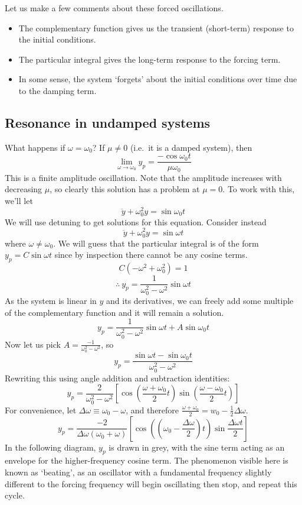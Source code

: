 Let us make a few comments about these forced oscillations.
\begin{itemize}
	\item The complementary function gives us the transient (short-term) response to the initial conditions.
	\item The particular integral gives the long-term response to the forcing term.
	\item In some sense, the system `forgets' about the initial conditions over time due to the damping term.
\end{itemize}

\subsection{Resonance in undamped systems}
What happens if \(\omega = \omega_0\)?
If \(\mu \neq 0\) (i.e.\ it is a damped system), then
\[
	\lim_{\omega \to \omega_0} y_p = \frac{-\cos\omega_0 t}{\mu\omega_0}
\]
This is a finite amplitude oscillation.
Note that the amplitude increases with decreasing \(\mu\), so clearly this solution has a problem at \(\mu = 0\).
To work with this, we'll let
\[
	\ddot y + \omega_0^2 y = \sin\omega_0 t
\]
We will use detuning to get solutions for this equation.
Consider instead
\[
	\ddot y + \omega_0^2 y = \sin\omega t
\]
where \(\omega \neq \omega_0\).
We will guess that the particular integral is of the form \(y_p = C\sin\omega t\) since by inspection there cannot be any cosine terms.
\[
	C(-\omega^2 + \omega_0^2) = 1
\]
\[
	\therefore\ y_p = \frac{1}{\omega_0^2 - \omega^2}\sin\omega t
\]
As the system is linear in \(y\) and its derivatives, we can freely add some multiple of the complementary function and it will remain a solution.
\[
	y_p = \frac{1}{\omega_0^2 - \omega^2}\sin\omega t + A \sin\omega_0 t
\]
Now let us pick \(A = \frac{-1}{\omega_0^2 - \omega^2}\), so
\[
	y_p = \frac{\sin \omega t - \sin \omega_0 t}{\omega_0^2 - \omega^2}
\]
Rewriting this using angle addition and subtraction identities:
\[
	y_p = \frac{2}{\omega_0^2 - \omega^2}\left[ \cos\left( \frac{\omega + \omega_0}{2}t \right) \sin\left( \frac{\omega - \omega_0}{2}t \right) \right]
\]
For convenience, let \(\Delta\omega \equiv \omega_0 - \omega\), and therefore \(\frac{\omega + \omega_0}{2} = w_0 - \frac{1}{2}\Delta\omega\).
\[
	y_p = \frac{-2}{\Delta\omega(\omega_0 + \omega)}\left[ \cos\left( \left(\omega_0 - \frac{\Delta\omega}{2}\right)t \right) \sin\frac{\Delta\omega t}{2} \right]
\]
In the following diagram, \(y_p\) is drawn in grey, with the sine term acting as an envelope for the higher-frequency cosine term.
The phenomenon visible here is known as `beating', as an oscillator with a fundamental frequency slightly different to the forcing frequency will begin oscillating then stop, and repeat this cycle.

